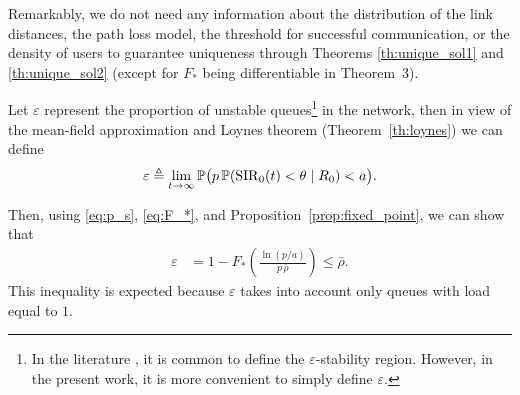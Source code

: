 {Remarkably, we do not need any information about the distribution of the link distances, the path loss model, the threshold for successful communication, or the density of users to guarantee uniqueness through Theorems} \ref{th:unique_sol1} and \ref{th:unique_sol2} (except for $F_*$ being differentiable in Theorem~3).

Let $\varepsilon$ represent the proportion of unstable queues\footnote{In the literature \cite{zhong2016stability}, it is common to define the $\varepsilon$-stability region. However, in the present work, it is more convenient to simply define $\varepsilon$.} in the network, then in view of the mean-field approximation and Loynes theorem (Theorem~\ref{th:loynes}) we can define
\begin{align}
    \varepsilon \triangleq \lim_{t\to\infty} {\mathbb P}\big( p\,{\mathbb P}(\mathrm{SIR}_0(t) < \theta \mid R_0) < a \big).
\end{align}

Then, using \eqref{eq:p_s}, \eqref{eq:F_*}, and Proposition~\ref{prop:fixed_point}, we can show that
\begin{align} \label{eq:eps}
    \varepsilon &= 1 - F_* \!\left(\frac{\ln(p/a)}{p\,\bar\rho}\right)
        \le \bar\rho.
\end{align}
This inequality is expected because $\varepsilon$ takes into account only queues with load equal to $1$.

